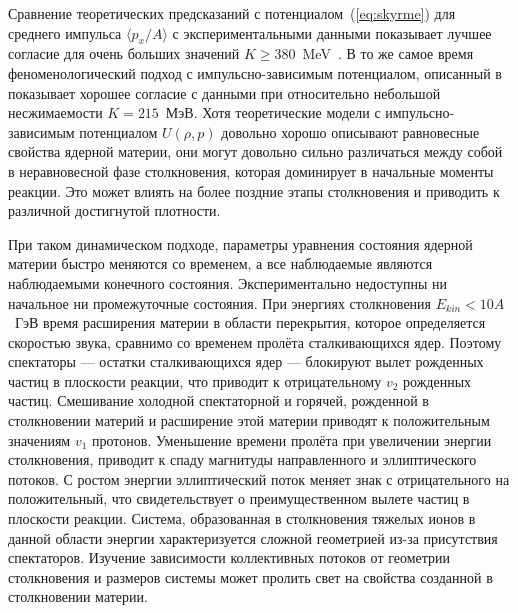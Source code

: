 Сравнение теоретических предсказаний с потенциалом~(\ref{eq:skyrme}) для среднего импульса $\langle p_x / A \rangle$ с экспериментальными данными показывает лучшее согласие для очень больших значений $K \ge 380$~MeV~\cite{Kruse:1985hy, Molitoris:1985gs}.
В то же самое время феноменологический подход с импульсно-зависимым потенциалом, описанный в~\cite{Gale:1987zz, Aichelin:1987ti, Welke:1988zz, Haddad:1995vt} показывает хорошее согласие с данными при относительно небольшой несжимаемости $K=215$~МэВ.
Хотя теоретические модели с импульсно-зависимым потенциалом $U(\rho, p)$ довольно хорошо описывают равновесные свойства ядерной материи, они могут довольно сильно различаться между собой в неравновесной фазе столкновения, которая доминирует в начальные моменты реакции.
Это может влиять на более поздние этапы столкновения и приводить к различной достигнутой плотности.

При таком динамическом подходе, параметры уравнения состояния ядерной материи быстро меняются со временем, а все наблюдаемые являются наблюдаемыми конечного состояния. 
Экспериментально недоступны ни начальное ни промежуточные состояния. 
При энергиях столкновения $E_{kin}<10A$~ГэВ время расширения материи в области перекрытия, которое определяется скоростью звука, сравнимо со временем пролёта сталкивающихся ядер.
Поэтому спектаторы --- остатки сталкивающихся ядер --- блокируют вылет рожденных частиц в плоскости реакции, что приводит к отрицательному $v_2$ рожденных частиц. 
Смешивание холодной спектаторной и горячей, рожденной в столкновении материй и расширение этой материи приводят к положительным значениям $v_1$ протонов.
Уменьшение времени пролёта при увеличении энергии столкновения, приводит к спаду магнитуды направленного и эллиптического потоков. 
С ростом энергии эллиптический поток меняет знак с отрицательного на положительный, что свидетельствует о преимущественном вылете частиц в плоскости реакции.
Система, образованная в столкновения тяжелых ионов в данной области энергии характеризуется сложной геометрией из-за присутствия спектаторов.
Изучение зависимости коллективных потоков от геометрии столкновения и размеров системы может пролить свет на свойства созданной в столкновении материи.

